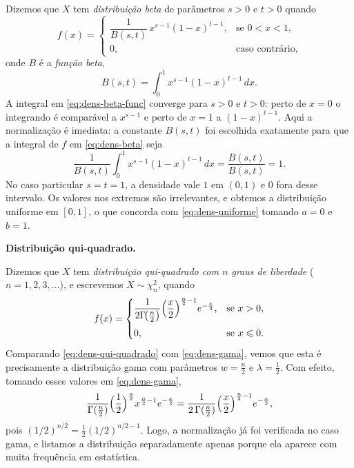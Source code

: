 \documentclass[12pt,portuguese]{article}
\theoremstyle{definition}
\theoremstyle{plainexercise}
\theoremstyle{starredexercise}
\theoremstyle{definition}
\begin{document}
Dizemos que $X$ tem \emph{distribuição beta} de parâmetros $s>0$ e $t>0$
quando
\begin{equation}
  f(x) =
  \begin{cases}
    \dfrac{1}{B(s,t)}\,x^{s-1}(1-x)^{t-1}, & \text{se } 0 < x < 1, \\[0.3cm]
    0, & \text{caso contrário},
  \end{cases}
  \label{eq:dens-beta}
\end{equation}
onde $B$ é a \emph{função beta},
\begin{equation}
  B(s,t) = \int_0^1 x^{s-1}(1-x)^{t-1}\,dx.
  \label{eq:dens-beta-func}
\end{equation}
A integral em \eqref{eq:dens-beta-func} converge para $s>0$ e $t>0$: perto de
$x=0$ o integrando é comparável a $x^{s-1}$ e perto de $x=1$ a $(1-x)^{t-1}$.
Aqui a normalização é imediata: a constante $B(s,t)$ foi escolhida
exatamente para que a integral de $f$ em \eqref{eq:dens-beta} seja
\[
  \frac{1}{B(s,t)}\int_0^1 x^{s-1}(1-x)^{t-1}\,dx
  = \frac{B(s,t)}{B(s,t)} = 1.
\]
No caso particular $s=t=1$, a densidade vale $1$ em $(0,1)$ e $0$ fora
desse intervalo. Os valores nos extremos são irrelevantes, e obtemos a
distribuição uniforme em $[0,1]$, o que concorda com
\eqref{eq:dens-uniforme} tomando $a=0$ e $b=1$.


\bigskip 

\noindent\textbf{Distribuição qui-quadrado.}

Dizemos que $X$ tem \emph{distribuição qui-quadrado com $n$ graus de
liberdade} ($n=1,2,3,\dots$), e escrevemos $X\sim\chi_n^2$, quando
\begin{equation}
  f(x) = \begin{cases}
    \dfrac{1}{2\Gamma\!\bigl(\frac{n}{2}\bigr)}
    \Bigl(\dfrac{x}{2}\Bigr)^{\frac{n}{2}-1} e^{-\frac{x}{2}}, & \text{se } x > 0, \\[0.4cm]
    0, & \text{se } x \leqslant 0.
  \end{cases}
  \label{eq:dens-qui-quadrado}
\end{equation}
Comparando \eqref{eq:dens-qui-quadrado} com \eqref{eq:dens-gama}, vemos que
esta é precisamente a distribuição gama com parâmetros $w=\frac{n}{2}$ e
$\lambda=\frac{1}{2}$. Com efeito, tomando esses valores em \eqref{eq:dens-gama},
\[
  \frac{1}{\Gamma(\frac{n}{2})}\Bigl(\frac{1}{2}\Bigr)^{\frac{n}{2}}
  x^{\frac{n}{2}-1}e^{-\frac{x}{2}}
  = \frac{1}{2\,\Gamma(\frac{n}{2})}
  \Bigl(\frac{x}{2}\Bigr)^{\frac{n}{2}-1} e^{-\frac{x}{2}},
\]
pois $(1/2)^{n/2}=\frac{1}{2}(1/2)^{n/2-1}$. Logo, a normalização já foi verificada no caso gama, e
listamos a distribuição separadamente apenas porque ela aparece com muita
frequência em estatística.
\end{document}
